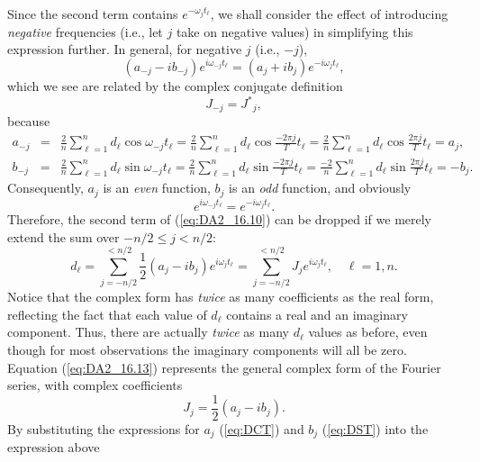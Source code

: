 Since the second term contains $e^{-\omega_j t_{\ell}}$, we shall consider the effect of introducing \emph{negative}
frequencies (i.e., let $j$ take on negative values) in simplifying this expression further. In general, for negative $j$ (i.e., $-j$),
\begin{equation}
\left (a_{-j} - ib_{-j}\right )e^{i\omega_{-j} t_{\ell}} = \left (a_j +ib_j \right ) e^{-i \omega_j t_{\ell}},
\end{equation}
which we see are related by the complex conjugate definition
\begin{equation}
J_{-j} = {J^*}_j,
\end{equation}
because
$$
\begin{array} {rcl}
a_{-j} &=& \displaystyle \frac{2}{n} \sum^n_{\ell=1} d_{\ell} \cos \omega_{-j} t_{\ell} =\frac {2}{n} \sum^n_{\ell=1} d_{\ell} \cos \frac{-2 \pi j}{T}t_{\ell} = \frac{2}{n} \sum^n_{\ell=1} d_{\ell} \cos \frac{2\pi j}{T}t_{\ell} = a_j,\\[14pt]
b_{-j} &=& \displaystyle \frac{2}{n} \sum^{n}_{\ell=1} d_{\ell} \sin \omega_{-j} t_{\ell} = \frac {2}{n} \sum^n_{\ell=1} d_{\ell} \sin \frac {-2 \pi j}{T} t_{\ell} = \frac{-2}{n} \sum^n_{\ell=1} d_{\ell} \sin \frac{2 \pi j}{T} t_{\ell} = -b_j.
\end{array}
$$
Consequently, $a_j$ is an \emph{even} function, $b_j$ is an \emph{odd} function, and obviously
$$
e^{i \omega_{-j} t_{\ell}} = e^ {-i\omega_j t_{\ell}}.
$$
Therefore, the second term of (\ref{eq:DA2_16.10}) can be dropped if we merely extend the sum over
$-n/2 \leq j < n/2$:
\begin{equation}
\boxed{d_{\ell} = \sum^{< n/2}_{j = -n/2} \frac{1}{2} (a_j - ib_j) e^{i\omega_j t_{\ell}}= \sum^{< n/2}_{j = -n/2} J_j e^{i \omega_j t_{\ell}},\quad \ell=1,n.}
\label{eq:DA2_16.13}
\end{equation}
Notice that the complex form has \emph{twice} as many coefficients as the real form, reflecting the fact
that each value of $d_{\ell}$ contains a real and an imaginary component.  Thus, there are actually \emph{twice} as many $d_{\ell}$
values as before, even though for most observations the imaginary components will all be zero.
Equation (\ref{eq:DA2_16.13}) represents the general complex form of the Fourier series, with complex coefficients
\begin{equation}
J_j = \frac{1}{2} (a_j-ib_j).
\end{equation}
By substituting the expressions for $a_j$ (\ref{eq:DCT}) and $b_j$ (\ref{eq:DST}) into the expression above
